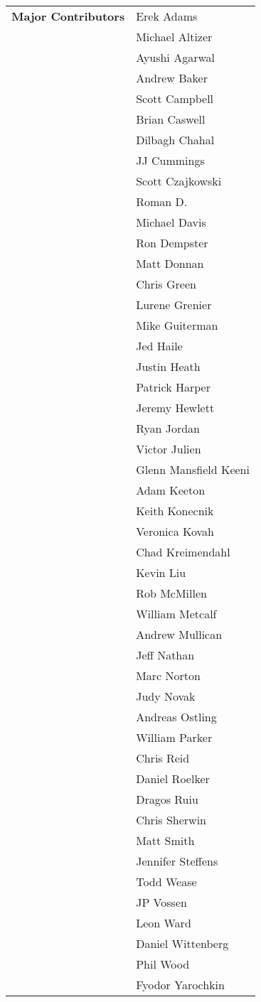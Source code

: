\documentclass[english]{report}
\begin{document}
\begin{tabular}{p{3in} p{3in}}
\textbf{Major Contributors}
& Erek Adams\\
& Michael Altizer\\
& Ayushi Agarwal\\
& Andrew Baker\\
& Scott Campbell\\
& Brian Caswell\\
& Dilbagh Chahal\\
& JJ Cummings\\
& Scott Czajkowski\\
& Roman D.\\
& Michael Davis\\
& Ron Dempster\\
& Matt Donnan\\
& Chris Green\\
& Lurene Grenier\\
& Mike Guiterman\\
& Jed Haile\\
& Justin Heath\\
& Patrick Harper\\
& Jeremy Hewlett\\
& Ryan Jordan\\
& Victor Julien\\
& Glenn Mansfield Keeni\\
& Adam Keeton\\
& Keith Konecnik\\
& Veronica Kovah\\
& Chad Kreimendahl\\
& Kevin Liu\\
& Rob McMillen\\
& William Metcalf\\
& Andrew Mullican\\
& Jeff Nathan\\
& Marc Norton\\
& Judy Novak\\
& Andreas Ostling\\
& William Parker\\
& Chris Reid\\
& Daniel Roelker\\
& Dragos Ruiu\\
& Chris Sherwin\\
& Matt Smith\\
& Jennifer Steffens\\
& Todd Wease\\
& JP Vossen\\
& Leon Ward\\
& Daniel Wittenberg\\
& Phil Wood\\
& Fyodor Yarochkin\\
\end{tabular}
\end{document}
